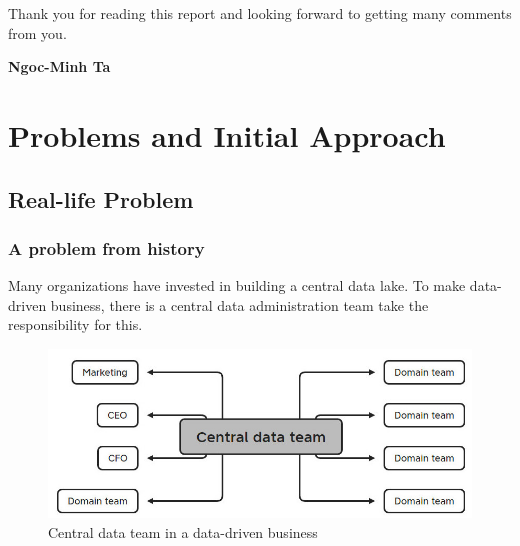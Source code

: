 \documentclass[12pt, a4paper]{book}
\begin{document}
Thank you for reading this report and looking forward to getting many comments from you.\\
\vspace{0.5cm}

\raggedleft
\textbf{Ngoc-Minh Ta}

\justifying
{}

        \tableofcontents
        \begingroup
        \listoffigures
        \let\clearpage\relax
        \listoftables
        \endgroup
        
    \endgroup
    
    \begingroup
        \frontmatter
        \justifying
        \let\cleardoublepage\clearpage
    \endgroup
    
    \mainmatter
    \justifying
    \normalsize
\chapter{Problems and Initial Approach}

\section{Real-life Problem}
\subsection{A problem from history}
Many organizations have invested in building a central data lake. To make data-driven business, there is a central data administration team take the responsibility for this.

\begin{figure}[h]
	\begin{framed}
		\centering
		\includegraphics[width=14cm]{CentralDataTeam.jpg}
		\caption{Central data team in a data-driven business}
		\label{centraldata}
	\end{framed}
\end{figure}
\end{document}
